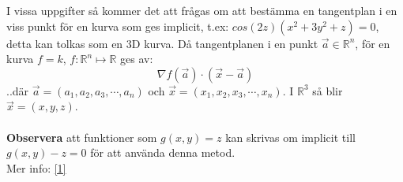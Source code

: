 \documentclass{report}
\begin{document}
{
	I vissa uppgifter så kommer det att frågas om att bestämma en tangentplan i en viss punkt för en kurva som ges implicit, t.ex: $ cos(2z)(x^2+3y^2+z) = 0 $, detta kan tolkas som en 3D kurva. Då tangentplanen i en punkt $\vec{a} \in \mathbb{R}^n $, för en kurva $f = k$, $f : \mathbb{R}^n \mapsto \mathbb{R} $ ges av:
	\begin{equation*}
		\nabla 	f(\vec{a}) \cdot (\vec{x} - \vec{a})
	\end{equation*}
	..där $\vec{a} = (a_1, a_2, a_3, \cdots, a_n)$ och $\vec{x} = (x_1, x_2, x_3, \cdots, x_n)$. I $\mathbb{R}^3$ så blir $\vec{x} = (x,y,z) $.\\\\
	
	\textbf{Observera} att funktioner som $g(x,y) = z$ kan skrivas om implicit till $g(x,y) - z = 0$ för att använda denna metod.\\
	Mer info: \href{https://math.stackexchange.com/a/2084635}{[1]}
}
\end{document}

